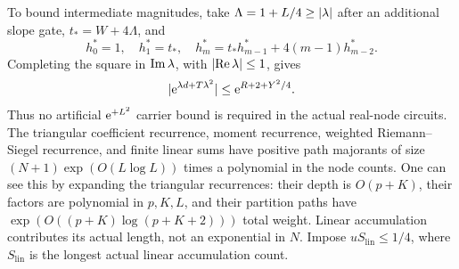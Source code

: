 To bound intermediate magnitudes, take
\(\Lambda=1+L/4\ge\lvert \lambda\rvert\) after an additional slope gate,
\(t_*=W+4\Lambda\), and
\[
 h_0^*=1,\quad h_1^*=t_*,\quad
 h_m^*=t_*h_{m-1}^*+4(m-1)h_{m-2}^*.
\]
Completing the square in \(\operatorname{Im}\lambda\), with
\(\lvert \operatorname{Re}\lambda\rvert\le1\), gives
\[
 \lvert \mathrm e^{\lambda d+T\lambda^2}\rvert
                  \le\mathrm e^{R+2+Y^2/4}.
\]
Thus no artificial \(\mathrm e^{+L^2}\) carrier bound is required
in the actual real-node circuits.
The triangular coefficient recurrence, moment recurrence,
weighted Riemann--Siegel recurrence, and finite linear sums
have positive path majorants of size
\((N+1)\exp(O(L\log L))\) times a polynomial in the node counts.
One can see this by expanding the triangular recurrences:
their depth is \(O(p+K)\), their factors are polynomial in
\(p,K,L\), and their partition paths have
\(\exp(O((p+K)\log(p+K+2)))\) total weight.
Linear accumulation contributes its actual length, not
an exponential in \(N\). Impose
\(uS_{\mathrm{lin}}\le1/4\), where \(S_{\mathrm{lin}}\)
is the longest actual linear accumulation count.

